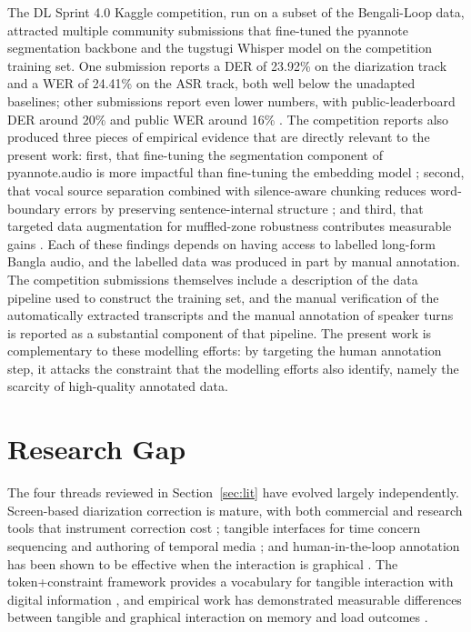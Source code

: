 \documentclass[10pt,a4paper,twocolumn]{article}
\begin{document}
The DL Sprint 4.0 Kaggle competition, run on a subset of the
Bengali-Loop data, attracted multiple community submissions
that fine-tuned the pyannote segmentation backbone and the
tugstugi Whisper model on the competition training set. One
submission \citep{bhuiyan2026banglawsd} reports a DER of
23.92\% on the diarization track and a WER of 24.41\% on the
ASR track, both well below the unadapted baselines; other
submissions report even lower numbers, with public-leaderboard
DER around 20\% and public WER around 16\%
\citep{tanvir2026shobdosetu}. The competition reports also produced three
pieces of empirical evidence that are directly relevant to the
present work: first, that fine-tuning the segmentation component
of pyannote.audio is more impactful than fine-tuning the
embedding model \citep{chowdhury2026robustbn}; second, that vocal source
separation combined with silence-aware chunking reduces
word-boundary errors by preserving sentence-internal structure
\citep{chowdhury2026robustbn}; and third, that targeted data augmentation
for muffled-zone robustness contributes measurable gains
\citep{tanvir2026shobdosetu}. Each of these findings depends on having
access to labelled long-form Bangla audio, and the labelled
data was produced in part by manual annotation. The competition
submissions themselves include a description of the data
pipeline used to construct the training set, and the manual
verification of the automatically extracted transcripts and
the manual annotation of speaker turns is reported as a
substantial component of that pipeline. The present work is
complementary to these modelling efforts: by targeting the
human annotation step, it attacks the constraint that the
modelling efforts also identify, namely the scarcity of
high-quality annotated data.

\section{Research Gap}\label{sec:gap}

The four threads reviewed in Section~\ref{sec:lit} have evolved
largely independently. Screen-based diarization correction is
mature, with both commercial and research tools that instrument
correction cost \citep{broux2018cassid, tahon2024allies,
yamaguchi2026voxmap}; tangible interfaces for time concern
sequencing and authoring of temporal media
\citep{jorda2007reactable, bennett2012chronotape,
kaltenbrunner2018tquencer, mahieux2022sablier}; and human-in-the-loop
annotation has been shown to be effective when the interaction is
graphical \citep{prokopalo2022active}. The token+constraint
framework provides a vocabulary for tangible interaction with
digital information \citep{ullmer2005tokenconstraint,
ullmer2003tangiblequery, ishii1997tangiblebits}, and empirical
work has demonstrated measurable differences between tangible and
graphical interaction on memory and load outcomes
\citep{patten2000spatcmp, chandrasekera2015cogload}.
\end{document}
